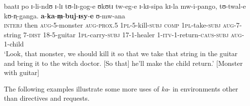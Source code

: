 \begin{exe}
\ex \label{exDistalOtherSubject}
\gll baatɪ po ɪ-li-ndʊ ɪ-lɪ tʊ-lɪ-gog-e ʊkʊtɪ tw-eg-e ɪ-kɪ-sipa kɪ-la mw-i-pango, tʊ-twal-e kʊ-n̩-ganga. \textbf{a}-\textbf{ka}-\textbf{m̩}-\textbf{buj}-\textbf{ɪsy}-\textbf{e} ʊ-mw-ana\\
\textsc{interj} then \textsc{aug}-5-monster \textsc{aug}-\textsc{prox.5} \textsc{1pl}-5-kill-\textsc{subj} \textsc{comp} \textsc{1pl}-take-\textsc{subj} \textsc{aug}-7-string 7-\textsc{dist} 18-5-guitar \textsc{1pl}-carry-\textsc{subj} 17-1-healer 1-\textsc{itv}-1-return-\textsc{caus}-\textsc{subj} \textsc{aug}-1-child\\
\glt \lq Look, that monster, we should kill it so that we take that string in the guitar and bring it to the witch doctor. [So that] he'll make the child return.' [Monster with guitar]
\end{exe}

\largerpage
The following examples illustrate some more uses of \textit{ka}- in environments other than directives and requests.

